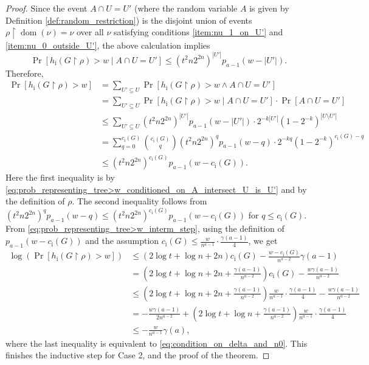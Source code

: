 \documentclass[10pt,a4paper]{article}
\theoremstyle{remark}
\newtheorem*{switching lemma}{Switching Lemma}
\newtheorem*{open problem}{Open Problem}
\theoremstyle{definition}
\DeclareMathOperator{\dom}{dom}
\begin{document}
\begin{proof}
Since the event $A \cap U = U'$ (where the random variable $A$ is given by Definition \ref{def:random_restriction}) is the disjoint union of events $\rho \! \restriction \! \dom(\nu) = \nu$ over all $\nu$ satisfying conditions \ref{item:nu_1_on_U'} and \ref{item:nu_0_outside_U'}, the above calculation implies 
\begin{equation}
\label{eq:prob_representing_tree>w_conditioned_on_A_intersect_U_is_U'}
 \Pr[h_{\text{i}}(G \! \restriction \! \rho) > w \mid A \cap U = U'] \leq  \left(t^2 n 2^{2n} \right)^{|U'|} p_{a-1}(w - |U'|).
\end{equation}
Therefore,
\begin{align}
 \Pr[h_{\text{i}}(G \! \restriction \! \rho) > w] & = \sum_{U' \subseteq U} \Pr[h_{\text{i}}(G \! \restriction \! \rho) > w \land A \cap U = U'] \nonumber \\
& = \sum_{U' \subseteq U} \Pr[h_{\text{i}}(G \! \restriction \! \rho) > w \mid A \cap U = U'] \cdot \Pr[A \cap U = U'] \nonumber \\
& \leq \sum_{U' \subseteq U}  \left(t^2 n 2^{2n} \right)^{|U'|} p_{a-1}(w - |U'|) \cdot 2^{-k |U'|} \left( 1 - 2^{-k} \right)^{|U \setminus U'|}  \nonumber \\
& = \sum_{q = 0}^{c_{\text{i}}(G)}  \binom{c_{\text{i}}(G)}{q} \left(t^2 n 2^{2n} \right)^{q} p_{a-1}(w - q) \cdot 2^{-kq} \left( 1 - 2^{-k} \right)^{c_{\text{i}}(G) - q}  \nonumber \\
& \leq \left(t^2 n 2^{2n} \right)^{c_{\text{i}}(G)} p_{a-1}(w - c_{\text{i}}(G)). \label{eq:prob_representing_tree>w_interm_step}
\end{align}
Here the first inequality is by \ref{eq:prob_representing_tree>w_conditioned_on_A_intersect_U_is_U'} and by the definition of $\rho$. The second inequality follows from $\left(t^2 n 2^{2n} \right)^{q} p_{a-1}(w - q) \leq \left(t^2 n 2^{2n} \right)^{c_{\text{i}}(G)} p_{a-1}(w - c_{\text{i}}(G))$ for $q \leq c_{\text{i}}(G)$. From \ref{eq:prob_representing_tree>w_interm_step}, using the definition of $p_{a-1}(w - c_{\text{i}}(G))$ and the assumption $c_{\text{i}}(G) \leq \frac{w}{n^{a-1}} \cdot \frac{\gamma(a-1)}{4}$, we get
\begin{align*}
\log (\Pr[h_{\text{i}}(G \! \restriction \! \rho) > w]) & \leq \left( 2 \log t + \log n + 2n \right) c_{\text{i}}(G) - \frac{w - c_{\text{i}}(G)}{n^{a-2}} \gamma(a-1) \\
& = \left(2 \log t + \log n + 2n + \frac{\gamma(a-1)}{n^{a-2}} \right) c_{\text{i}}(G) - \frac{w \gamma(a-1)}{n^{a-2}} \\
& \leq \left(2 \log t + \log n + 2n + \frac{\gamma(a-1)}{n^{a-2}} \right) \frac{w}{n^{a-1}} \cdot \frac{\gamma(a-1)}{4} - \frac{w \gamma(a-1)}{n^{a-2}} \\
& = - \frac{w \gamma(a-1)}{2n^{a-2}} + \left(2 \log t + \log n + \frac{\gamma(a-1)}{n^{a-2}} \right) \frac{w}{n^{a-1}} \cdot \frac{\gamma(a-1)}{4} \\
& \leq  - \frac{w}{n^{a-1}} \gamma(a),
\end{align*}
where the last inequality is equivalent to \ref{eq:condition_on_delta_and_n0}. This finishes the inductive step for Case 2, and the proof of the theorem.
\end{proof}
\end{document}
